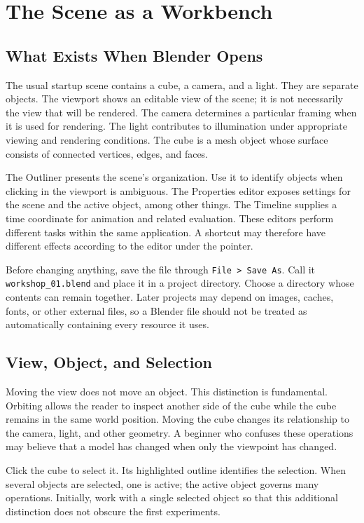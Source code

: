 \documentclass[11pt,openany]{book}
\newcommand{\file}[1]{\texttt{#1}}
\begin{document}
\chapter{The Scene as a Workbench}

\section{What Exists When Blender Opens}

The usual startup scene contains a cube, a camera, and a light. They are separate objects. The viewport shows an editable view of the scene; it is not necessarily the view that will be rendered. The camera determines a particular framing when it is used for rendering. The light contributes to illumination under appropriate viewing and rendering conditions. The cube is a mesh object whose surface consists of connected vertices, edges, and faces.

The Outliner presents the scene's organization. Use it to identify objects when clicking in the viewport is ambiguous. The Properties editor exposes settings for the scene and the active object, among other things. The Timeline supplies a time coordinate for animation and related evaluation. These editors perform different tasks within the same application. A shortcut may therefore have different effects according to the editor under the pointer.

{\sloppy Before changing anything, save the file through \texttt{File\,>\,Save As}. Call it \file{workshop\_01.blend} and place it in a project directory. Choose a directory whose contents can remain together. Later projects may depend on images, caches, fonts, or other external files, so a Blender file should not be treated as automatically containing every resource it uses.\par}

\section{View, Object, and Selection}

Moving the view does not move an object. This distinction is fundamental. Orbiting allows the reader to inspect another side of the cube while the cube remains in the same world position. Moving the cube changes its relationship to the camera, light, and other geometry. A beginner who confuses these operations may believe that a model has changed when only the viewpoint has changed.

Click the cube to select it. Its highlighted outline identifies the selection. When several objects are selected, one is active; the active object governs many operations. Initially, work with a single selected object so that this additional distinction does not obscure the first experiments.
\end{document}
